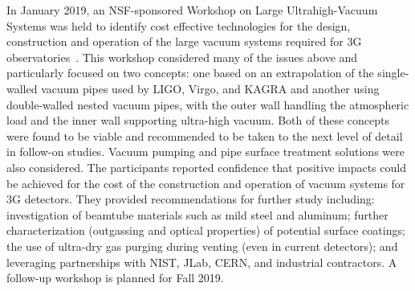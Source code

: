 In January 2019, an NSF-sponsored Workshop on Large Ultrahigh-Vacuum Systems was held to identify cost effective technologies for the design, construction and operation of the large vacuum systems required for 3G observatories~\cite{LLOVacWorkshop2019}. This workshop considered many of the issues above and particularly focused on two concepts: one based on an extrapolation of the single-walled vacuum pipes used by LIGO, Virgo, and KAGRA and another using double-walled nested vacuum pipes, with the outer wall handling the atmospheric load and the inner wall supporting ultra-high vacuum. Both of these concepts were found to be viable and recommended to be taken to the next level of detail in follow-on studies. Vacuum pumping and pipe surface treatment solutions were also considered. The participants reported confidence that positive impacts could be achieved for the cost of the construction and operation of vacuum systems for 3G detectors. They provided recommendations for further study including: investigation of beamtube materials such as mild steel and aluminum; further characterization (outgassing and optical properties) of potential surface coatings; the use of ultra-dry gas purging during venting (even in current detectors); and leveraging partnerships with NIST, JLab, CERN, and industrial contractors. A follow-up workshop is planned for Fall 2019.


